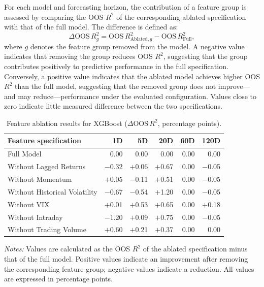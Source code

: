 \documentclass[12pt,twoside]{ord}
\begin{document}
For each model and forecasting horizon, the contribution of a feature group is assessed by comparing the OOS $R^2$ of the corresponding ablated specification with that of the full model. The difference is defined as:
\begin{equation}\label{eq:delta_oos_r2}
\Delta \mathrm{OOS}\,R^2_g = \mathrm{OOS}\,R^2_{\text{Ablated},g} - \mathrm{OOS}\,R^2_{\text{Full}},
\end{equation}
where $g$ denotes the feature group removed from the model. A negative value indicates that removing the group reduces OOS $R^2$, suggesting that the group contributes positively to predictive performance in the full specification. Conversely, a positive value indicates that the ablated model achieves higher OOS $R^2$ than the full model, suggesting that the removed group does not improve---and may reduce---performance under the evaluated configuration. Values close to zero indicate little measured difference between the two specifications.

\begin{table}[htbp]
\centering
\caption{Feature ablation results for XGBoost ($\Delta \mathrm{OOS}\,R^2$, percentage points).}\label{tab:ablation_xgboost}
{\footnotesize
\setlength{\tabcolsep}{6pt}
\begin{tabular}{lrrrrr}
\hline
Feature specification & 1D & 5D & 20D & 60D & 120D \\
\hline
Full Model & 0.00 & 0.00 & 0.00 & 0.00 & 0.00 \\
Without Lagged Returns & $-$0.32 & $+$0.06 & $+$0.67 & 0.00 & $-$0.05 \\
Without Momentum & $+$0.05 & $-$0.11 & $+$0.51 & 0.00 & $-$0.05 \\
Without Historical Volatility & $-$0.67 & $-$0.54 & $+$1.20 & 0.00 & $-$0.05 \\
Without VIX & $+$0.01 & $+$0.53 & $+$0.65 & 0.00 & $+$0.18 \\
Without Intraday & $-$1.20 & $+$0.09 & $+$0.75 & 0.00 & $-$0.05 \\
Without Trading Volume & $+$0.60 & $+$0.21 & $+$0.37 & 0.00 & 0.00 \\
\hline
\end{tabular}
}
\par\vspace{4pt}\parbox{\linewidth}{\fontsize{9pt}{12pt}\selectfont\textit{Notes:} Values are calculated as the OOS $R^2$ of the ablated specification minus that of the full model. Positive values indicate an improvement after removing the corresponding feature group; negative values indicate a reduction. All values are expressed in percentage points.}
\end{table}
\end{document}
